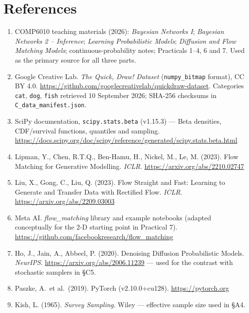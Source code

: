 \documentclass[10pt,a4paper]{article}
\begin{document}
\section*{References}
\small
\begin{enumerate}[leftmargin=1.4em,itemsep=0pt]
\item COMP6010 teaching materials (2026): \emph{Bayesian Networks I}; \emph{Bayesian Networks 2 --
Inference}; \emph{Learning Probabilistic Models}; \emph{Diffusion and Flow Matching Models};
continuous-probability notes; Practicals 1--4, 6 and 7. Used as the primary source for all three parts.
\item Google Creative Lab. \emph{The Quick, Draw! Dataset} (\texttt{numpy\_bitmap} format), CC BY 4.0.
\url{https://github.com/googlecreativelab/quickdraw-dataset}. Categories \texttt{cat}, \texttt{dog},
\texttt{fish} retrieved 10 September 2026; SHA-256 checksums in \texttt{C\_data\_manifest.json}.
\item SciPy documentation, \texttt{scipy.stats.beta} (v1.15.3) --- Beta densities, CDF/survival
functions, quantiles and sampling. \url{https://docs.scipy.org/doc/scipy/reference/generated/scipy.stats.beta.html}
\item Lipman, Y., Chen, R.T.Q., Ben-Hamu, H., Nickel, M., Le, M. (2023). Flow Matching for Generative
Modelling. \emph{ICLR}. \url{https://arxiv.org/abs/2210.02747}
\item Liu, X., Gong, C., Liu, Q. (2023). Flow Straight and Fast: Learning to Generate and Transfer Data
with Rectified Flow. \emph{ICLR}. \url{https://arxiv.org/abs/2209.03003}
\item Meta AI. \emph{flow\_matching} library and example notebooks (adapted conceptually for the 2-D
starting point in Practical 7). \url{https://github.com/facebookresearch/flow_matching}
\item Ho, J., Jain, A., Abbeel, P. (2020). Denoising Diffusion Probabilistic Models. \emph{NeurIPS}.
\url{https://arxiv.org/abs/2006.11239} --- used for the contrast with stochastic samplers in \S C5.
\item Paszke, A.\ et al.\ (2019). PyTorch (v2.10.0+cu128). \url{https://pytorch.org}
\item Kish, L. (1965). \emph{Survey Sampling}. Wiley --- effective sample size used in \S A4.
\end{enumerate}
\end{document}
